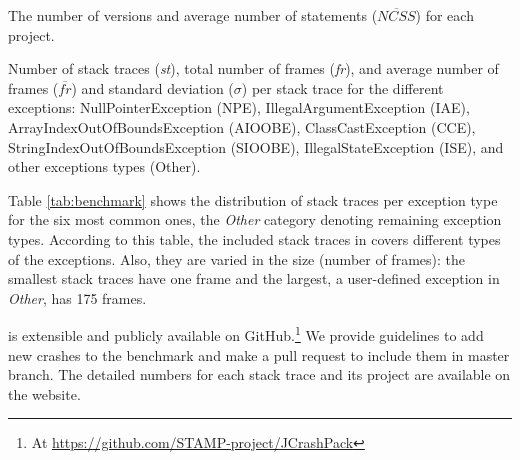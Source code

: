 \begin{table}[t]
	\centering
	\caption{The number of versions and average number of statements ($\overline{NCSS}$) for each project.}
	\label{tab:benchmark:complexity}
	
\end{table}

\begin{table}[t]
	\centering
	\caption{Number of stack traces (\textit{st}), total number of frames (\textit{fr}), and average number of frames ($\overline{fr}$) and standard deviation ($\sigma$) per stack trace for the different exceptions: NullPointerException (NPE), IllegalArgumentException (IAE), ArrayIndexOutOfBoundsException (AIOOBE), ClassCastException (CCE), StringIndexOutOfBoundsException (SIOOBE), IllegalStateException (ISE), and other exceptions types (Other). }
	\label{tab:benchmark}
%	
    \begin{scriptsize}
	 
    \end{scriptsize}
\end{table}

Table \ref{tab:benchmark} shows the distribution of stack traces per exception type for the six most 
common ones, the \textit{Other} category denoting remaining exception types. According to this table, the included stack traces in \crashpack covers different types of the exceptions. Also, they are varied in the size (number of frames): the smallest stack traces have one frame and the largest, a user-defined exception in \textit{Other}, has 175 frames.

\crashpack is extensible and publicly available on GitHub.\footnote{At \url{https://github.com/STAMP-project/JCrashPack}} We provide guidelines to add new crashes to the benchmark and make a pull request to include them in \crashpack master branch.
%
The detailed numbers for each stack trace and its project are available on the \crashpack website.

